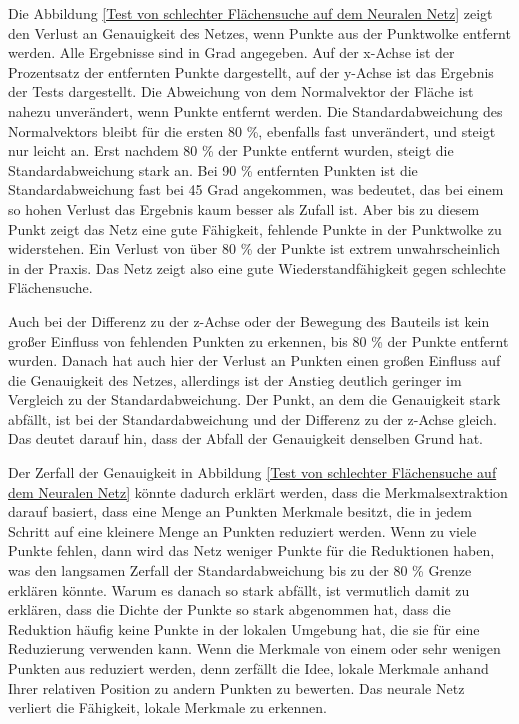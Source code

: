 Die Abbildung \ref{Test von schlechter Flächensuche auf dem Neuralen Netz} zeigt den Verlust an Genauigkeit des Netzes, wenn Punkte aus der Punktwolke entfernt werden. Alle Ergebnisse sind in Grad angegeben. Auf der x-Achse ist der Prozentsatz der entfernten Punkte dargestellt, 
auf der y-Achse ist das Ergebnis der Tests dargestellt. Die Abweichung von dem Normalvektor der Fläche ist nahezu unverändert, wenn Punkte entfernt werden. Die Standardabweichung des Normalvektors bleibt für die ersten 80 \%, ebenfalls
fast unverändert, und steigt nur leicht an. Erst nachdem 80 \% der Punkte entfernt wurden, steigt die Standardabweichung stark an. Bei 90 \% entfernten Punkten ist die Standardabweichung fast bei 45 Grad angekommen, was bedeutet, das bei einem so hohen Verlust das Ergebnis kaum besser als Zufall ist.
Aber bis zu diesem Punkt zeigt das Netz eine gute Fähigkeit, fehlende Punkte in der Punktwolke zu widerstehen. Ein Verlust von über 80 \% der Punkte ist extrem unwahrscheinlich in der Praxis. Das Netz zeigt also eine gute Wiederstandfähigkeit gegen schlechte Flächensuche.

\smallskip

Auch bei der Differenz zu der z-Achse oder der Bewegung des Bauteils ist kein großer Einfluss von fehlenden Punkten zu erkennen, bis 80 \% der Punkte entfernt wurden. 
Danach hat auch hier der Verlust an Punkten einen großen Einfluss auf die Genauigkeit des Netzes, allerdings ist der Anstieg deutlich geringer im Vergleich zu der Standardabweichung.
Der Punkt, an dem die Genauigkeit stark abfällt, ist bei der Standardabweichung und der Differenz zu der z-Achse gleich. Das deutet darauf hin, dass der Abfall der Genauigkeit denselben Grund hat.

\smallskip

Der Zerfall der Genauigkeit in Abbildung \ref{Test von schlechter Flächensuche auf dem Neuralen Netz} könnte dadurch erklärt werden, dass die Merkmalsextraktion darauf basiert, dass eine Menge an Punkten Merkmale besitzt, die in jedem Schritt auf eine kleinere Menge an Punkten reduziert werden.
Wenn zu viele Punkte fehlen, dann wird das Netz weniger Punkte für die Reduktionen haben, was den langsamen Zerfall der Standardabweichung bis zu der 80 \% Grenze erklären könnte. Warum es danach so stark abfällt, ist vermutlich damit zu erklären, 
dass die Dichte der Punkte so stark abgenommen hat, dass die Reduktion häufig keine Punkte in der lokalen Umgebung hat, die sie für eine Reduzierung verwenden kann. Wenn die Merkmale von einem oder sehr wenigen Punkten aus reduziert werden, 
denn zerfällt die Idee, lokale Merkmale anhand Ihrer relativen Position zu andern Punkten zu bewerten. Das neurale Netz verliert die Fähigkeit, lokale Merkmale zu erkennen.

